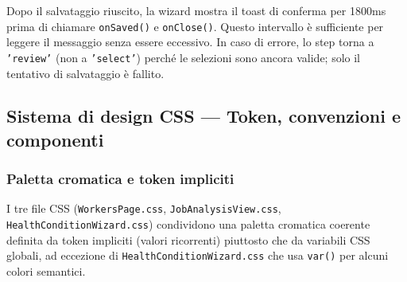 \documentclass[a4paper,12pt]{article}
\begin{document}
\noindent Dopo il salvataggio riuscito, la wizard mostra il toast di conferma
per 1800ms prima di chiamare \texttt{onSaved()} e \texttt{onClose()}.
Questo intervallo \`{e} sufficiente per leggere il messaggio senza
essere eccessivo. In caso di errore, lo step torna a \texttt{'review'}
(non a \texttt{'select'}) perch\'{e} le selezioni sono ancora valide;
solo il tentativo di salvataggio \`{e} fallito.


\subsection{Sistema di design CSS --- Token, convenzioni e componenti}

\subsubsection{Paletta cromatica e token impliciti}

I tre file CSS (\texttt{WorkersPage.css}, \texttt{JobAnalysisView.css},
\texttt{HealthConditionWizard.css}) condividono una paletta cromatica
coerente definita da token impliciti (valori ricorrenti) piuttosto che
da variabili CSS globali, ad eccezione di \texttt{HealthConditionWizard.css}
che usa \texttt{var()} per alcuni colori semantici.
\end{document}
